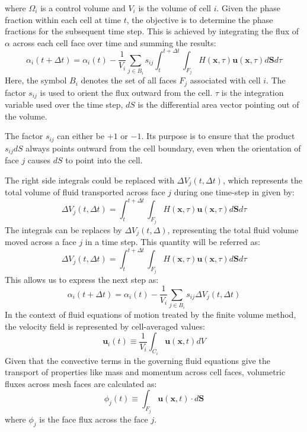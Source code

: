 where $\Omega_i$ is a control volume and $V_i$ is the volume of cell $i$. Given the phase fraction within each cell at time $t$, the objective is to determine the phase fractions for the subsequent time step. This is achieved by integrating the flux of $\alpha$ across each cell face over time and summing the results: 
\begin{equation}\label{isoAd-2_}
    \alpha_{i}(t+\Delta t)=\alpha_{i}(t)-\frac{1}{V_{i}} \sum_{j \in B_{i}} s_{i j} \int_{t}^{t+\Delta t} \int_{F_{j}} H(\boldsymbol{x}, \tau) \boldsymbol{u}(\boldsymbol{x}, \tau) d \boldsymbol{S} d \tau
\end{equation}
Here, the symbol $B_i$ denotes the set of all faces $F_j$ associated with cell $i$. The factor $s_{ij}$ is used to orient the flux outward from the cell. $\tau$ is the integration variable used over the time step, $dS$ is the differential area vector pointing out of the volume.

The factor $s_{ij}$ can either be $+1$ or $-1$. Its purpose is to ensure that the product $s_{ij}dS$ always points outward from the cell boundary, even when the orientation of face $j$ causes $dS$ to point into the cell.

The right side integrals could be replaced with $\Delta V_j(t,\Delta t)$, which represents the total volume of fluid transported across face $j$ during one time-step in given by:
\begin{equation}\label{isoAd-1}
    \Delta V_{j}(t, \Delta t)=\int_{t}^{t+\Delta t} \int_{F_{j}} H(\boldsymbol{x}, \tau) \boldsymbol{u}(\boldsymbol{x}, \tau) d \boldsymbol{S} d \tau
\end{equation}
The integrals can be replaces by $\Delta V_j(t,\Delta)$, representing the total fluid volume moved across a face $j$ in a time step. This quantity will be referred as:
\begin{equation}
\Delta V_j(t, \Delta t)=\int_t^{t+\Delta t} \int_{F_j} H(\boldsymbol{x}, \tau) \boldsymbol{u}(\boldsymbol{x}, \tau) d \boldsymbol{S} d \tau
\end{equation}
This allows us to express the next step as: 
\begin{equation}
\alpha_{i}(t+\Delta t)=\alpha_{i}(t)-\frac{1}{V_{i}} \sum_{j \in B_{i}} s_{i j} \Delta V_{j}(t, \Delta t)
\end{equation}
In the context of fluid equations of motion treated by the finite volume method, the velocity field is represented by cell-averaged values:
\begin{equation}
\mathbf{u}_{i}(t) \equiv \frac{1}{V_{i}} \int_{C_i} \mathbf{u}(\mathbf{x}, t) d V
\end{equation}
Given that the convective terms in the governing fluid equations give the transport of properties like mass and momentum across cell faces, volumetric fluxes across mesh faces are calculated as:
\begin{equation}\label{isoAd-3}
\phi_{j}(t) \equiv \int_{F_{j}} \mathbf{u}(\mathbf{x}, t) \cdot d \mathbf{S}
\end{equation}
where $\phi_{j}$ is the face flux across the face $j$.
